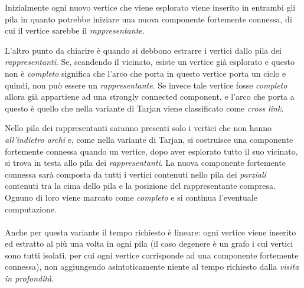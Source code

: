 Inizialmente ogni nuovo vertice che viene esplorato viene
inserito in entrambi gli pila in quanto potrebbe iniziare una nuova
componente fortemente connessa, di cui il vertice sarebbe il
\emph{rappresentante}. 

L'altro punto da chiarire \`e quando si debbono estrarre i vertici
dallo pila dei \emph{rappresentanti}. Se, scandendo il vicinato,
esiste un vertice gi\`a esplorato e questo non \`e \emph{completo}
significa che l'arco che porta in questo vertice porta un ciclo e
quindi, non pu\`o essere un \emph{rappresentante}. Se invece tale
vertice fosse \emph{completo} allora gi\`a appartiene ad una strongly
connected component, e l'arco che porta a questo \`e quello che nella
variante di Tarjan viene classificato come \emph{cross link}.

Nello pila dei rappresentanti saranno presenti solo i vertici che non
hanno \emph{all'indietro archi} e, come nella variante di Tarjan, si
costruisce una componente fortemente connessa quando un vertice, dopo
aver esplorato tutto il suo vicinato, si trova in testa allo pila dei
\emph{rappresentanti}. La nuova componente fortemente connessa sar\`a
composta da tutti i vertici contenuti nello pila dei \emph{parziali}
contenuti tra la cima dello pila e la posizione del rappresentante
compresa. Ognuno di loro viene marcato come \emph{completo} e si
continua l'eventuale computazione.
\\\\
Anche per questa variante il tempo richiesto \`e lineare: ogni vertice
viene inserito ed estratto al pi\`u una volta in ogni pila (il caso
degenere \`e un grafo i cui vertici sono tutti isolati, per cui ogni
vertice corrisponde ad una componente fortemente connessa), non
aggiungendo asintoticamente niente al tempo richiesto dalla
\emph{visita in profondit\`a}.




